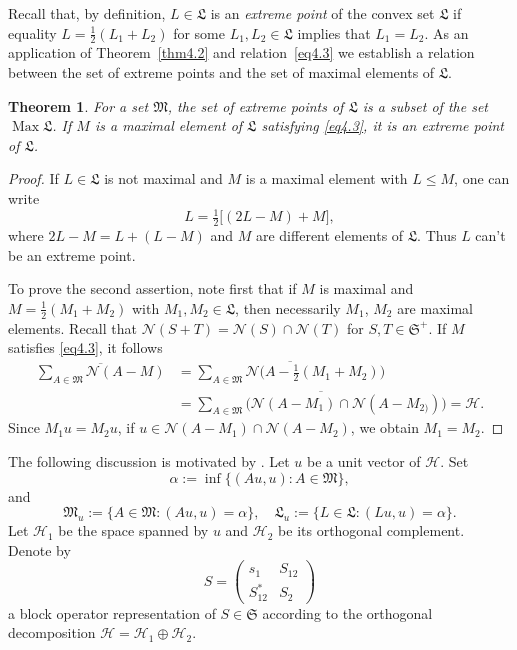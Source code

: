 \documentclass[12pt, a4paper, reqno, twoside]{amsart}
\numberwithin{equation}{section}
\DeclareMathOperator{\Max}{Max}
\newcommand{\frakS}{\mathfrak S}
\newcommand{\frakL}{\mathfrak L}
\newcommand{\frakM}{\mathfrak M}
\newtheorem{theorem}{Theorem}[section]
\theoremstyle{definition}
\theoremstyle{remark}
\theoremstyle{mystyle}
\begin{document}
Recall that, by definition, $L\in\frakL$ is an \emph{extreme point} of
the convex set $\frakL$ if equality $L=\frac{1}{2}(L_{1}+L_{2})$ for
some $L_{1},L_{2}\in\frakL$ implies that $L_{1}=L_{2}$. As an
application of Theorem~\ref{thm4.2} and relation~\eqref{eq4.3} we
establish a relation between the set of extreme points and the set of
maximal elements of $\frakL$.

\begin{theorem}
\label{thm4.4}
For a set $\frakM$, the set of extreme points of $\frakL$ is a subset
of the set $\Max\frakL$. If $M$ is a maximal element of $\frakL$
satisfying \eqref{eq4.3}, it is an extreme point of $\frakL$.
\end{theorem}

\begin{proof}
If $L\in\frakL$ is not maximal and $M$ is a maximal element with
$L\leq M$, one can write
\[
  L=\tfrac{1}{2}\bigl[(2L-M)+M\bigr],
\]
where
$2L-M=L+(L-M)$ and $M$ are different elements of $\frakL$. Thus $L$
can't be an extreme point.
 
To prove the second assertion, note first that if $M$ is maximal and
$M=\frac{1}{2}(M_{1}+M_{2})$ with $M_{1},M_{2}\in\frakL$, then
necessarily $M_{1}$, $M_{2}$ are maximal elements. Recall that
$\mathscr N(S+T)=\mathscr N(S)\cap\mathscr N(T)$ for
$S,T\in\frakS^{+}$. If $M$ satisfies \eqref{eq4.3}, it follows
\begin{align*}
    \overline{\sum_{A\in\frakM} \mathscr N(A-M)} 
& = \overline{\sum_{A\in\frakM} \mathscr N
    \bigl(A-\tfrac{1}{2}(M_{1}+M_{2})\bigr)} \\
& = \overline{\sum_{A\in\frakM} \bigl(\mathscr N(A-M_{1})
    \cap\mathscr N(A-M_{2)})\bigr)}
  = \mathscr H.
\end{align*}
Since $M_{1}u=M_{2}u$, if $u\in\mathscr N(A-M_{1})\cap\mathscr
N(A-M_{2})$, we obtain $M_{1}=M_{2}$.
\end{proof}

The following discussion is motivated by
\cite[Sect.~4]{Stott2016arxiv}. Let $u$ be a unit vector of $\mathscr
H$. Set
\[
  \alpha :=\inf\bigl\{(Au,u):A\in\frakM\bigr\}, 
\]
and
\[  
  \frakM_{u} :=\bigl\{A\in\frakM:(Au,u)=\alpha\bigr\}, \quad
  \frakL_{u} :=\bigl\{L\in\frakL:(Lu,u)=\alpha\bigr\}.
\]
Let $\mathscr H_{1}$ be the space spanned by $u$ and $\mathscr H_{2}$
be its orthogonal complement. Denote by
\[
  S= \begin{pmatrix}
  s_{1} & S_{12} \\ S_{12}^{\ast} & S_{2}
  \end{pmatrix}
\]
a block operator representation of $S\in\frakS$ according to the
orthogonal decomposition $\mathscr H=\mathscr H_{1}\oplus\mathscr H_{2}$.
\end{document}
